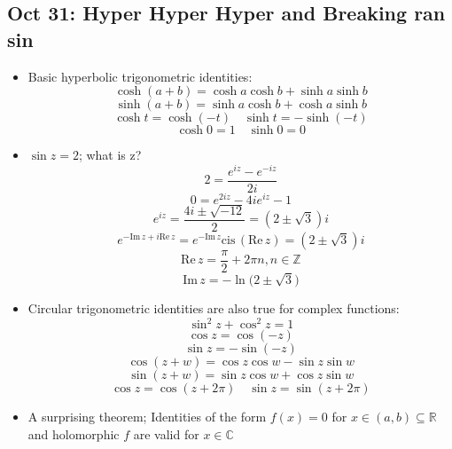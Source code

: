\documentclass[10pt, oneside]{article}
\newcommand{\R}{\mathbb{R}}
\newcommand{\C}{\mathbb{C}}
\newcommand{\Z}{\mathbb{Z}}
\newcommand{\cis}{\text{cis} \,}
\renewcommand{\Re}{\text{Re} \,}
\renewcommand{\Im}{\text{Im} \,}
\begin{document}
\subsection{Oct 31: Hyper Hyper Hyper and Breaking ran sin}
\begin{itemize}
    \item Basic hyperbolic trigonometric identities:
        \[\cosh(a+b) = \cosh a \cosh b + \sinh a \sinh b\]
        \[\sinh(a+b) = \sinh a \cosh b + \cosh a \sinh b\]
        \[\cosh t = \cosh (-t) \quad \sinh t = - \sinh (-t)\]
        \[\cosh 0 = 1 \quad \sinh 0 = 0\]
    \item $\sin z = 2$; what is z?
        \[2 = \frac{e^{iz} - e^{-iz}}{2i}\]
        \[0 = e^{2iz} - 4ie^{iz} - 1\]
        \[e^{iz} = \frac{4i \pm \sqrt{-12}}{2} = (2 \pm \sqrt{3})i\]
        \[e^{-\Im z + i\Re z} = e^{-\Im z} \cis(\Re z) = (2 \pm \sqrt{3})i\]
        \[\Re z = \frac{\pi}{2} + 2\pi n, n \in \Z\]
        \[\Im z = -\ln \big( 2 \pm \sqrt{3} \big)\]
    \item Circular trigonometric identities are also true for complex functions:
        \[\sin^2 z + \cos^2 z = 1\]
        \[\cos z = \cos(-z)\]
        \[\sin z = -\sin(-z)\]
        \[\cos(z+w) = \cos z \cos w - \sin z \sin w\]
        \[\sin(z+w) = \sin z \cos w + \cos z \sin w\]
        \[\cos z = \cos(z + 2\pi) \quad \sin z = \sin(z +  2\pi)\]
    \item A surprising theorem; Identities of the form $f(x) = 0$ for $x \in (a,b) \subseteq \R$ and holomorphic $f$ are valid for $x \in \C$
\end{itemize}
\end{document}
